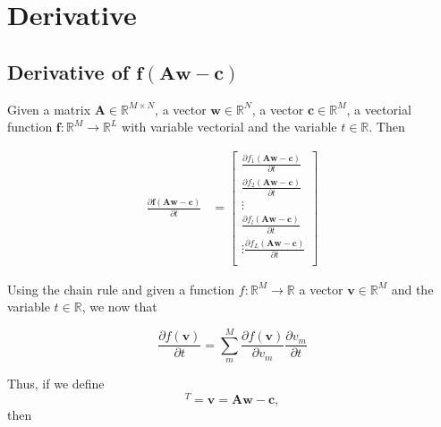 \section{Derivative}


\subsection{Derivative of $\mathbf{f}\left(\mathbf{A}\mathbf{w}-\mathbf{c}\right)$}

Given 
a matrix $\mathbf{A} \in \mathbb{R}^{M\times N}$,
a vector $\mathbf{w} \in \mathbb{R}^{N}$,
a vector $\mathbf{c} \in \mathbb{R}^{M}$,
a vectorial function $\mathbf{f}:\mathbb{R}^{M} \to \mathbb{R}^{L}$ with variable vectorial
and 
the variable $t \in \mathbb{R}$. 
Then

\begin{align}
\label{eq:fAwc}
\frac{\partial \mathbf{f}\left(\mathbf{A}\mathbf{w}-\mathbf{c}\right)}{\partial t}
&=
\begin{bmatrix}
\frac{\partial f_{1}\left(\mathbf{A}\mathbf{w}-\mathbf{c}\right)}{\partial t}\\[4pt]
\frac{\partial f_{2}\left(\mathbf{A}\mathbf{w}-\mathbf{c}\right)}{\partial t}\\[4pt]
\vdots\\[4pt]
\frac{\partial f_{l}\left(\mathbf{A}\mathbf{w}-\mathbf{c}\right)}{\partial t}\\[4pt]
\vdots
\frac{\partial f_{L}\left(\mathbf{A}\mathbf{w}-\mathbf{c}\right)}{\partial t}\\[4pt]
\end{bmatrix}
\end{align}

Using the chain rule \cite[pp. 15]{petersen2008matrix} and 
given 
a function $f:\mathbb{R}^{M} \to \mathbb{R}$ 
a vector $\mathbf{v} \in \mathbb{R}^{M}$ 
and 
the variable $t \in \mathbb{R}$,
we now that

\begin{equation}
\frac{\partial f\left(\mathbf{v}\right)}{\partial t} = 
\sum_{m}^{M}
\frac{\partial f\left(\mathbf{v}\right)}{\partial v_m}
\frac{\partial v_m}{\partial t}
\end{equation}

Thus, if we define 
\begin{equation}
[\dots,~v_{m},~\dots]^{T}=\mathbf{v}=\mathbf{A}\mathbf{w}-\mathbf{c},
\end{equation}
then

